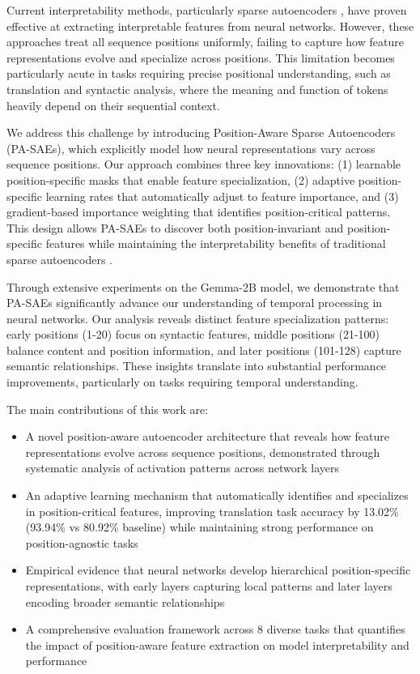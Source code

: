 \documentclass{article} %
\begin{document}
Current interpretability methods, particularly sparse autoencoders \cite{Cunningham2023SparseAF}, have proven effective at extracting interpretable features from neural networks. However, these approaches treat all sequence positions uniformly, failing to capture how feature representations evolve and specialize across positions. This limitation becomes particularly acute in tasks requiring precise positional understanding, such as translation and syntactic analysis, where the meaning and function of tokens heavily depend on their sequential context.

We address this challenge by introducing Position-Aware Sparse Autoencoders (PA-SAEs), which explicitly model how neural representations vary across sequence positions. Our approach combines three key innovations: (1) learnable position-specific masks that enable feature specialization, (2) adaptive position-specific learning rates that automatically adjust to feature importance, and (3) gradient-based importance weighting that identifies position-critical patterns. This design allows PA-SAEs to discover both position-invariant and position-specific features while maintaining the interpretability benefits of traditional sparse autoencoders \cite{goodfellow2016deep}.

Through extensive experiments on the Gemma-2B model, we demonstrate that PA-SAEs significantly advance our understanding of temporal processing in neural networks. Our analysis reveals distinct feature specialization patterns: early positions (1-20) focus on syntactic features, middle positions (21-100) balance content and position information, and later positions (101-128) capture semantic relationships. These insights translate into substantial performance improvements, particularly on tasks requiring temporal understanding.

The main contributions of this work are:
\begin{itemize}
    \item A novel position-aware autoencoder architecture that reveals how feature representations evolve across sequence positions, demonstrated through systematic analysis of activation patterns across network layers
    \item An adaptive learning mechanism that automatically identifies and specializes in position-critical features, improving translation task accuracy by 13.02\% (93.94\% vs 80.92\% baseline) while maintaining strong performance on position-agnostic tasks
    \item Empirical evidence that neural networks develop hierarchical position-specific representations, with early layers capturing local patterns and later layers encoding broader semantic relationships
    \item A comprehensive evaluation framework across 8 diverse tasks that quantifies the impact of position-aware feature extraction on model interpretability and performance
\end{itemize}
\end{document}
